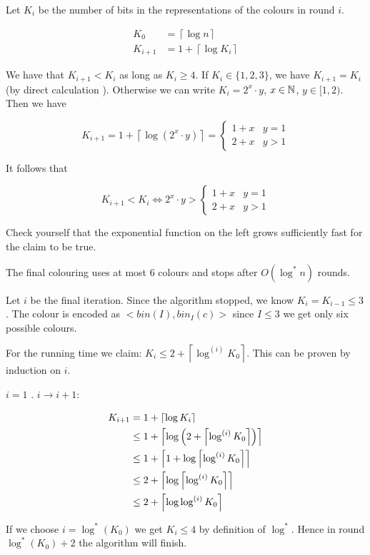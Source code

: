 \begin{lem} Let $K_i$ be the number of bits in the representations of the colours in round $i$.

\begin{align*}
K_0 &= \left\lceil \log n\right\rceil\\
K_{i+1} &= 1+\left\lceil\log K_i\right\rceil
\end{align*}

\end{lem}

\begin{pr}
We have that $K_{i+1} < K_i$ as long as $K_i\geq 4$. If $K_i\in \{1,2,3\}$, we have $K_{i+1}=K_i$ (by direct calculation \ok). Otherwise we can write $K_i=2^x\cdot y$, $x\in \mathbb{N}$, $y\in [1,2)$. Then we have

\[K_{i+1} = 1+\left\lceil \log(2^x\cdot y)\right\rceil = \begin{cases} 1+x & y=1\\ 2+x &y>1\end{cases}\]

It follows that

\[K_{i+1}<K_i \Leftrightarrow 2^x\cdot y > \begin{cases} 1+x & y=1\\ 2+x &y>1\end{cases}\]

Check yourself that the exponential function on the left grows sufficiently fast for the claim to be true.
\end{pr}

\begin{thm} The final colouring uses at most 6 colours and stops after $O(\log^* n)$ rounds.\end{thm}

\begin{pr} Let $i$ be the final iteration. Since the algorithm stopped, we know $K_i=K_{i-1} \leq 3$. The colour is encoded as $<bin(I), bin_I(c)>$ since $I\leq 3$ we get only six possible colours.

For the running time we claim: $K_i\leq 2+ \left\lceil \log^{(i)} K_0 \right\rceil$. This can be proven by induction on $i$. 

$i=1$ \ok. $i\rightarrow i+1$:

\begin{align*}
K_{i+1}&= 1+\left\lceil \log K_i \right\rceil\\
	&\leq 1+ \left\lceil \log\left(2+\left\lceil \log^{(i)}K_0 \right\rceil\right) \right\rceil\\
	&\leq 1+\left\lceil 1+\log \left\lceil \log^{(i)} K_0 \right\rceil \right\rceil\\
	&\leq 2+\left\lceil \log \left\lceil \log^{(i)} K_0 \right\rceil \right\rceil\\
	&\leq 2+\left\lceil \log \log^{(i)} K_0 \right\rceil\\
\end{align*}

If we choose $i=\log^*(K_0)$ we get $K_i\leq 4$ by definition of $\log^*$. Hence in round $\log^*(K_0)+2$ the algorithm will finish.
\end{pr}

